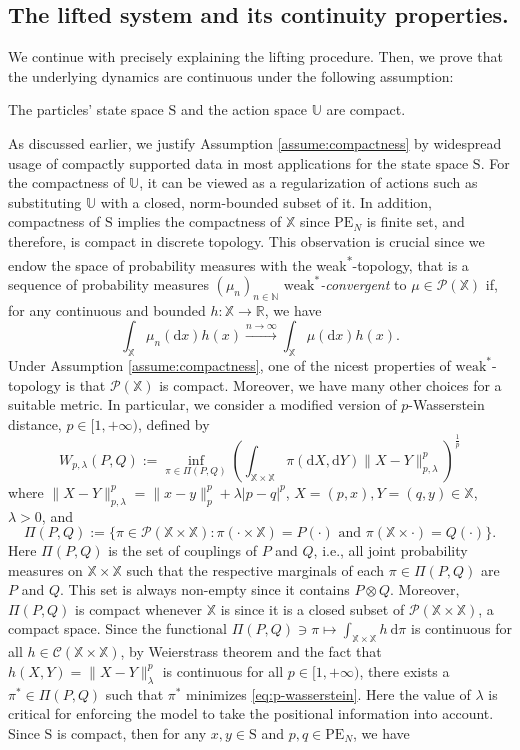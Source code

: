 \documentclass[11pt]{article}
\newcommand{\RR}{\mathbb{R}}
\newcommand{\NN}{\mathbb{N}}
\newcommand{\XX}{\mathbb{X}}
\newcommand{\UU}{\mathbb{U}}
\newcommand{\cC}{\mathcal{C}}
\newcommand{\cP}{\mathcal{P}}
\newcommand{\de}{\mathrm{d}} %
\begin{document}
\subsection{The lifted system and its continuity properties.} We continue with precisely explaining the lifting procedure. Then, we prove that the underlying dynamics are continuous under the following assumption:
\begin{assume}\label{assume:compactness}
    The particles' state space $\mathrm{S}$ and the action space $\UU$ are compact.
\end{assume}
As discussed earlier, we justify Assumption \ref{assume:compactness} by widespread usage of compactly supported data in most applications for the state space $\mathrm{S}$. For the compactness of $\UU$, it can be viewed as a regularization of actions such as substituting $\UU$ with a closed, norm-bounded subset of it. In addition, compactness of $\mathrm{S}$ implies the compactness of $\XX$ since $\mathrm{PE}_N$ is finite set, and therefore, is compact in discrete topology. This observation is crucial since we endow the space of probability measures with the weak\textsuperscript{*}-topology, that is a sequence of probability measures $(\mu_n)_{n\in\NN}$ \emph{$\text{weak}^*$-convergent} to $\mu\in\cP(\XX)$ if, for any continuous and bounded $h:\XX\to\RR$, we have 
\begin{equation*}
    \int_\XX\mu_n(\de x)h(x) \xrightarrow{n\to\infty} \int_\XX\mu(\de x)h(x).
\end{equation*} 
Under Assumption \ref{assume:compactness}, one of the nicest properties of $\text{weak}^*$-topology is that $\cP(\XX)$ is compact. Moreover, we have many other choices for a suitable metric. In particular, we consider a modified version of $p$-Wasserstein distance, $p\in[1,+\infty)$, defined by
\begin{equation}\label{eq:p-wasserstein}
    W_{p,\lambda}(P,Q) := \inf_{\pi\in\Pi(P,Q)}\left(\int_{\XX\times\XX}\pi(\de X, \de Y) \|X-Y\|_{p,\lambda}^p \right)^{\frac{1}{p}}
\end{equation} 
where $\|X-Y\|_{p,\lambda}^p = \|x-y\|_p^p + \lambda|p-q|^p$, $X=(p,x), Y = (q,y)\in\XX$, $\lambda > 0$, and 
\begin{equation*}
    \Pi(P,Q) := \{\pi\in\cP(\XX\times\XX) : \pi(\cdot\times\XX) = P(\cdot) \text{ and } \pi(\XX\times\cdot) = Q(\cdot)\}.
\end{equation*}
Here $\Pi(P,Q)$ is the set of couplings of $P$ and $Q$, i.e., all joint probability measures on $\XX\times\XX$ such that the respective marginals of each $\pi\in\Pi(P,Q)$ are $P$ and $Q$. This set is always non-empty since it contains $P\otimes Q$. Moreover, $\Pi(P,Q)$ is compact whenever $\XX$ is since it is a closed subset of $\cP(\XX\times\XX)$, a compact space. Since the functional $\Pi(P,Q)\ni \pi \mapsto \int_{\XX\times\XX} h\ \de\pi$ is continuous for all $h\in\cC(\XX\times\XX)$, by Weierstrass theorem and the fact that $h(X,Y) = \|X-Y\|_\lambda^p$ is continuous for all $p\in[1,+\infty)$, there exists a $\pi^*\in\Pi(P,Q)$ such that $\pi^*$ minimizes \eqref{eq:p-wasserstein}. Here the value of $\lambda$ is critical for enforcing the model to take the positional information into account. Since $\mathrm{S}$ is compact, then for any $x,y\in\mathrm{S}$ and $p,q\in\mathrm{PE}_N$, we have
\end{document}
